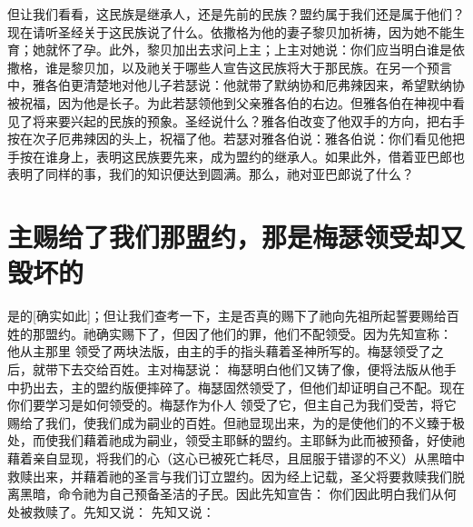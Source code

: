 但让我们看看，这民族是继承人，还是先前的民族？盟约属于我们还是属于他们？现在请听圣经关于这民族说了什么。依撒格为他的妻子黎贝加祈祷，因为她不能生育；她就怀了孕。此外，黎贝加出去求问上主；上主对她说：你们应当明白谁是依撒格，谁是黎贝加，以及祂关于哪些人宣告这民族将大于那民族。在另一个预言中，雅各伯更清楚地对他儿子若瑟说：他就带了默纳协和厄弗辣因来，希望默纳协被祝福，因为他是长子。为此若瑟领他到父亲雅各伯的右边。但雅各伯在神视中看见了将来要兴起的民族的预象。圣经说什么？雅各伯改变了他双手的方向，把右手按在次子厄弗辣因的头上，祝福了他。若瑟对雅各伯说：雅各伯说：你们看见他把手按在谁身上，表明这民族要先来，成为盟约的继承人。如果此外，借着亚巴郎也表明了同样的事，我们的知识便达到圆满。那么，祂对亚巴郎说了什么？\par


\section{主赐给了我们那盟约，那是梅瑟领受却又毁坏的}

是的[确实如此]；但让我们查考一下，主是否真的赐下了祂向先祖所起誓要赐给百姓的那盟约。祂确实赐下了，但因了他们的罪，他们不配领受。因为先知宣称：  他从主那里  领受了两块法版，由主的手的指头藉着圣神所写的。梅瑟领受了之后，就带下去交给百姓。主对梅瑟说：  梅瑟明白他们又铸了像，便将法版从他手中扔出去，主的盟约版便摔碎了。梅瑟固然领受了，但他们却证明自己不配。现在你们要学习是如何领受的。梅瑟作为仆人  领受了它，但主自己为我们受苦，将它赐给了我们，使我们成为嗣业的百姓。但祂显现出来，为的是使他们的不义臻于极处，而使我们藉着祂成为嗣业，领受主耶稣的盟约。主耶稣为此而被预备，好使祂藉着亲自显现，将我们的心（这心已被死亡耗尽，且屈服于错谬的不义）从黑暗中救赎出来，并藉着祂的圣言与我们订立盟约。因为经上记载，圣父将要救赎我们脱离黑暗，命令祂为自己预备圣洁的子民。因此先知宣告：  你们因此明白我们从何处被救赎了。先知又说： 先知又说： \par

